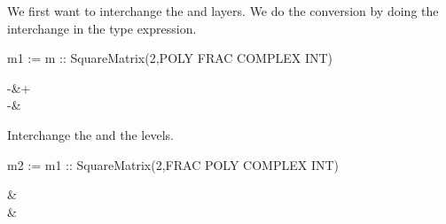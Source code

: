 \begin{xtc}
\begin{xtccomment}
We first want to interchange the  and
 layers.
We do the conversion by doing the interchange in the type expression.
\end{xtccomment}
\begin{spadsrc}
m1 := m :: SquareMatrix(2,POLY FRAC COMPLEX INT) 
\end{spadsrc}
\begin{TeXOutput}
\begin{fricasmath}{5}
\begin{MATRIX}{2}-{}&\TIMES {}+\\\TIMES %
-{}&%
\end{MATRIX}%
\end{fricasmath}
\end{TeXOutput}
\end{xtc}
\begin{xtc}
\begin{xtccomment}
Interchange the  and the
 levels.
\end{xtccomment}
\begin{spadsrc}
m2 := m1 :: SquareMatrix(2,FRAC POLY COMPLEX INT) 
\end{spadsrc}
\begin{TeXOutput}
\begin{fricasmath}{6}
\begin{MATRIX}{2}&\\&\end{MATRIX}%
\end{fricasmath}
\end{TeXOutput}
\end{xtc}
